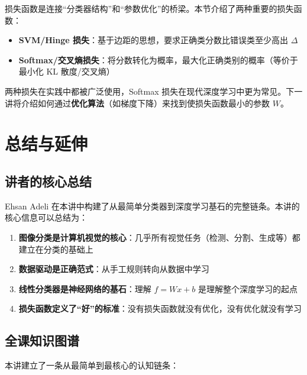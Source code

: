 \documentclass[a4paper]{article}
\begin{document}
损失函数是连接``分类器结构''和``参数优化''的桥梁。本节介绍了两种重要的损失函数：
\begin{itemize}
    \item \textbf{SVM/Hinge 损失}：基于边距的思想，要求正确类分数比错误类至少高出 $\Delta$
    \item \textbf{Softmax/交叉熵损失}：将分数转化为概率，最大化正确类别的概率（等价于最小化 KL 散度/交叉熵）
\end{itemize}

两种损失在实践中都被广泛使用，Softmax 损失在现代深度学习中更为常见。下一讲将介绍如何通过\textbf{优化算法}（如梯度下降）来找到使损失函数最小的参数 $W$。


\section{总结与延伸}

\subsection{讲者的核心总结}

Ehsan Adeli 在本讲中构建了从最简单分类器到深度学习基石的完整链条。本讲的核心信息可以总结为：

\begin{enumerate}
    \item \textbf{图像分类是计算机视觉的核心}：几乎所有视觉任务（检测、分割、生成等）都建立在分类的基础上
    \item \textbf{数据驱动是正确范式}：从手工规则转向从数据中学习
    \item \textbf{线性分类器是神经网络的基石}：理解 $f = Wx + b$ 是理解整个深度学习的起点
    \item \textbf{损失函数定义了``好''的标准}：没有损失函数就没有优化，没有优化就没有学习
\end{enumerate}

\subsection{全课知识图谱}

本讲建立了一条从最简单到最核心的认知链条：
\end{document}
